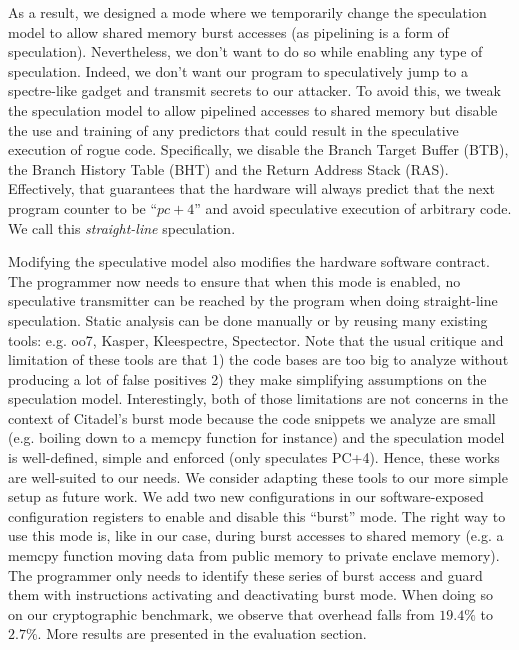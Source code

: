 As a result, we designed a mode where we temporarily change the speculation model to allow shared memory burst accesses (as pipelining is a form of speculation).
Nevertheless, we don't want to do so while enabling any type of speculation.
Indeed, we don't want our program to speculatively jump to a spectre-like gadget and transmit secrets to our attacker.
To avoid this, we tweak the speculation model to allow pipelined accesses to shared memory but disable the use and training of any predictors that could result in the speculative execution of rogue code.
Specifically, we disable the Branch Target Buffer (BTB), the Branch History Table (BHT) and the Return Address Stack (RAS).
Effectively, that guarantees that the hardware will always predict that the next program counter to be ``$pc+4$'' and avoid speculative execution of arbitrary code.
We call this \emph{straight-line} speculation.

Modifying the speculative model also modifies the hardware software contract.
The programmer now needs to ensure that when this mode is enabled, no speculative transmitter can be reached by the program when doing straight-line speculation.
Static analysis can be done manually or by reusing many existing tools: e.g. oo7\cite{wang2019oo7}, Kasper\cite{johannesmeyer2022kasper}, Kleespectre\cite{wang2020kleespectre}, Spectector\cite{guarnieri2020spectector}.
Note that the usual critique and limitation of these tools are that 1) the code bases are too big to analyze without producing a lot of false positives 2) they make simplifying assumptions on the speculation model.
Interestingly, both of those limitations are not concerns in the context of Citadel's burst mode because the code snippets we analyze are small (e.g. boiling down to a memcpy function for instance) and the speculation model is well-defined, simple and enforced (only speculates PC+4). Hence, these works are well-suited to our needs.
We consider adapting these tools to our more simple setup as future work.
We add two new configurations in our software-exposed configuration registers to enable and disable this ``burst'' mode.
The right way to use this mode is, like in our case, during burst accesses to shared memory (e.g. a memcpy function moving data from public memory to private enclave memory).
The programmer only needs to identify these series of burst access and guard them with instructions activating and deactivating burst mode.
When doing so on our cryptographic benchmark, we observe that overhead falls from $19.4\%$ to $2.7\%$.
More results are presented in the evaluation section.


